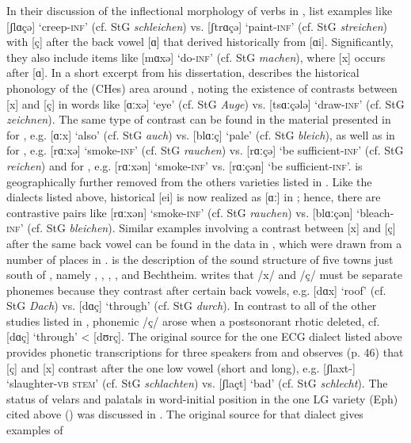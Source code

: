 In their discussion of the inflectional morphology of verbs in , \citet{WagnerHorn1900} list examples like [ʃlɑçǝ] ‘creep-\textsc{inf}’ (cf. StG \textit{schleichen}) vs. [ʃtrɑçǝ] ‘paint-\textsc{inf}’ (cf. StG \textit{streichen}) with [ç] after the back vowel [ɑ] that derived historically from [ɑi]. Significantly, they also include items like [mɑxǝ] ‘do-\textsc{inf}’ (cf. StG \textit{machen}), where [x] occurs after [ɑ]. In a short excerpt from his dissertation, \citet{Schwing1921} describes the historical phonology of the (CHes) area around , noting the existence of contrasts between [x] and [ç] in words like [ɑːxə] ‘eye’ (cf. StG \textit{Auge}) vs. [tsɑːçələ] ‘draw-\textsc{inf}’ (cf. StG \textit{zeichnen}). The same type of contrast can be found in the material presented in \citet{Schudt1927} for , e.g. [ɑːx] ‘also’ (cf. StG \textit{auch}) vs. [blɑːç] ‘pale’ (cf. StG \textit{bleich}), as well as in \citet{Christmann1927} for , e.g. [rɑːxə] ‘smoke-\textsc{inf}’ (cf. StG \textit{rauchen}) vs. [rɑːçə] ‘be sufficient-\textsc{inf}’ (cf. StG \textit{reichen}) and \citet{Haster1908} for , e.g. [rɑːxən] ‘smoke-\textsc{inf}’ vs. [rɑːçən] ‘be sufficient-\textsc{inf}’.  \citep{Fuchs1903} is geographically further removed from the others varieties listed in . Like the dialects listed above, historical [ei] is now realized as [ɑː] in ; hence, there are contrastive pairs like [rɑːxən] ‘smoke-\textsc{inf}’ (cf. StG \textit{rauchen}) vs. [blɑːçən] ‘bleach-\textsc{inf}’ (cf. StG \textit{bleichen}). Similar examples involving a contrast between [x] and [ç] after the same back vowel can be found in the data in \citet{Hasselberg1979}, which were drawn from a number of places in . \citet{Karch1981} is the description of the sound structure of five towns just south of , namely , , , , and Bechtheim. \citet[23]{Karch1981} writes that /x/ and /ç/ must be separate phonemes because they contrast after certain back vowels, e.g. [dɑx] ‘roof’ (cf. StG \textit{Dach}) vs. [dɑç] ‘through’ (cf. StG \textit{durch}). In contrast to all of the other studies listed in , phonemic /ç/  arose when a postsonorant rhotic deleted, cf. [dɑç] ‘through’ < [dʊrç]. The original source for the one ECG dialect listed above \citep{Guentherodt1982} provides phonetic transcriptions for three speakers from  and observes (p. 46) that [ç] and [x] contrast after the one low vowel (short and long), e.g. [ʃlaxt-] ‘slaughter-\textsc{vb} \textsc{stem}’ (cf. StG \textit{schlachten}) vs. [ʃlaçt] ‘bad’ (cf. StG \textit{schlecht}). The status of velars and palatals in word-initial position in the one LG variety (Eph) cited above () was discussed in . The original source for that dialect \citep{Schütze1953} gives examples of 